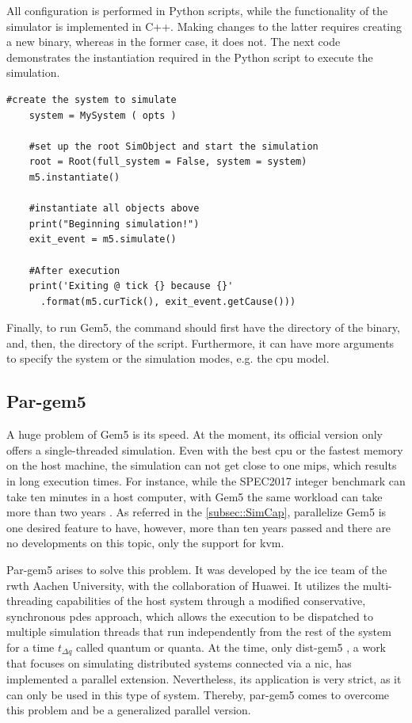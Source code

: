 All configuration is performed in Python scripts, while the functionality of the simulator is implemented in C++. Making changes to the 
latter requires creating a new binary, whereas in the former case, it does not. The next code demonstrates the instantiation 
required in the Python script to execute the simulation.

\pagebreak

\begin{lstlisting}[style=customPython, caption=Script to instantiate and execute the simulation]
    #create the system to simulate
    system = MySystem ( opts )

    #set up the root SimObject and start the simulation
    root = Root(full_system = False, system = system)
    m5.instantiate()

    #instantiate all objects above
    print("Beginning simulation!")
    exit_event = m5.simulate()

    #After execution
    print('Exiting @ tick {} because {}'
      .format(m5.curTick(), exit_event.getCause()))

\end{lstlisting}

Finally, to run Gem5, the command should first have the directory of the binary, and, then, the directory of the script. Furthermore, it can 
have more arguments to specify the system or the simulation modes, e.g. the \gls{cpu} model.

\subsection{Par-gem5}
\label{subsec:pargem5}

A huge problem of Gem5 is its speed. At the moment, its official version only offers a single-threaded simulation. Even with the best 
\gls{cpu} or the fastest memory on the host machine, the simulation can not get close to one \gls{mips}, which results in long execution 
times. For instance, while the SPEC2017 integer benchmark can take ten minutes in a host computer, with Gem5 the same workload can take more 
than two years \cite{pargem5}. As referred in the \autoref{subsec::SimCap}, parallelize Gem5 is one desired feature to have, however, more than 
ten years passed and there are no developments on this topic, only the support for \gls{kvm}. 

Par-gem5 \cite{pargem5} arises to solve this problem. It was developed by the \gls{ice} team of the \gls{rwth} Aachen University, with the 
collaboration of Huawei. It utilizes the multi-threading capabilities of the host system through a modified conservative, synchronous 
\gls{pdes} approach, which allows the execution to be dispatched to multiple simulation threads that run independently from the rest of 
the system for a time $t_{\Delta q}$ called quantum or quanta. At the time, only dist-gem5 \cite{dist-gem5}, a work that focuses 
on simulating distributed systems connected via a \gls{nic}, has implemented a parallel extension. Nevertheless, its application is very strict, 
as it can only be used in this type of system. Thereby, par-gem5 comes to overcome this problem and be a generalized parallel version.

